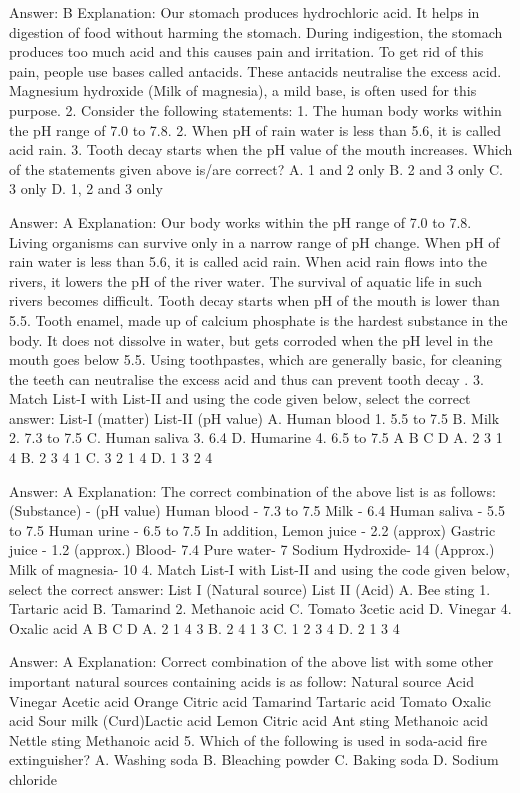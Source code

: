 Answer: B
Explanation: Our stomach produces hydrochloric acid. It helps in digestion of food without harming the stomach. During indigestion, the stomach produces too much acid and this causes pain and irritation. To get rid of this pain, people use bases called antacids. These antacids neutralise the excess acid. Magnesium hydroxide (Milk of magnesia), a mild base, is often used for this purpose. 2. Consider the following statements: 1. The human body works within the pH range of 7.0 to 7.8. 2. When pH of rain water is less than 5.6, it is called acid rain. 3. Tooth decay starts when the pH value of the mouth increases. Which of the statements given above is/are correct? A. 1 and 2 only B. 2 and 3 only C. 3 only D. 1, 2 and 3 only 

Answer: A
Explanation: Our body works within the pH range of 7.0 to 7.8. Living organisms can survive only in a narrow range of pH change. When pH of rain water is less than 5.6, it is called acid rain. When acid rain flows into the rivers, it lowers the pH of the river water. The survival of aquatic life in such rivers becomes difficult. Tooth decay starts when pH of the mouth is lower than 5.5. Tooth enamel, made up of calcium phosphate is the hardest substance in the body. It does not dissolve in water, but gets corroded when the pH level in the mouth goes below 5.5. Using toothpastes, which are generally basic, for cleaning the teeth can neutralise the excess acid and thus can prevent tooth decay . 3. Match List-I with List-II and using the code given below, select the correct 
answer: List-I (matter) List-II (pH value) A. Human blood 1. 5.5 to 7.5 B. Milk 2. 7.3 to 7.5 C. Human saliva 3. 6.4 
D. Humarine 4. 6.5 to 7.5 A B C D A. 2 3 1 4 B. 2 3 4 1 C. 3 2 1 4 D. 1 3 2 4 

Answer: A
Explanation: The correct combination of the above list is as follows: (Substance) - (pH value) Human blood - 7.3 to 7.5 Milk - 6.4 Human saliva - 5.5 to 7.5 Human urine - 6.5 to 7.5 In addition, Lemon juice - 2.2 (approx) Gastric juice - 1.2 (approx.) Blood- 7.4 Pure water- 7 Sodium Hydroxide- 14 (Approx.) Milk of magnesia- 10 4. Match List-I with List-II and using the code given below, select the correct 
answer: List I (Natural source) List II (Acid) A. Bee sting 1. Tartaric acid B. Tamarind 2. Methanoic acid C. 
Tomato 3cetic acid D. Vinegar 4. Oxalic acid A B C D A. 2 1 4 3 B. 2 4 1 3 C. 1 2 3 4 D. 2 1 3 4 

Answer: A
Explanation: Correct combination of the above list with some other important natural sources containing acids is as follow: Natural source Acid Vinegar Acetic acid Orange Citric acid Tamarind Tartaric acid Tomato Oxalic acid Sour milk (Curd)Lactic acid Lemon Citric acid Ant sting Methanoic acid Nettle sting Methanoic acid 5. Which of the following is used in soda-acid fire extinguisher? A. Washing soda B. Bleaching powder C. Baking soda D. Sodium chloride 

